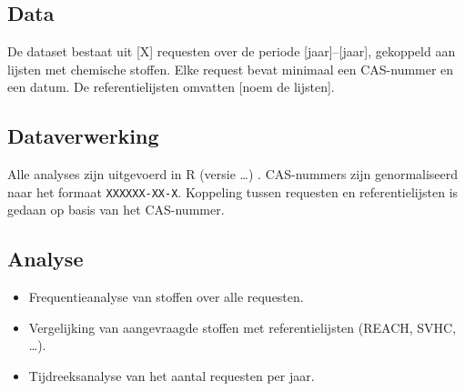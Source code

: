 
\subsection{Data}
De dataset bestaat uit [X] requesten over de periode [jaar]--[jaar],
gekoppeld aan lijsten met chemische stoffen. Elke request bevat minimaal
een CAS-nummer en een datum. De referentielijsten omvatten [noem de lijsten].

\subsection{Dataverwerking}
Alle analyses zijn uitgevoerd in R (versie \ldots) \citep{RCoreTeam2024}.
CAS-nummers zijn genormaliseerd naar het formaat \texttt{XXXXXX-XX-X}.
Koppeling tussen requesten en referentielijsten is gedaan op basis van
het CAS-nummer.

\subsection{Analyse}
\begin{itemize}
  \item Frequentieanalyse van stoffen over alle requesten.
  \item Vergelijking van aangevraagde stoffen met referentielijsten
        (REACH, SVHC, \ldots).
  \item Tijdreeksanalyse van het aantal requesten per jaar.
\end{itemize}

